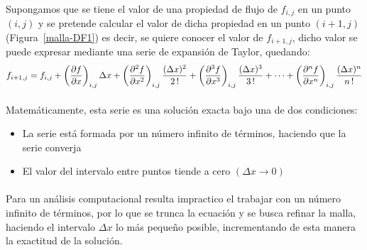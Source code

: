 \documentclass[letterpaper, openright, 12pt]{book}
\begin{document}
    \paragraph*{}
    Supongamos que se tiene el valor de una propiedad de flujo de $f_{i,j}$
    en un punto $(i,j)$ y se pretende calcular el valor de dicha propiedad
    en un punto $(i+1,j)$ (Figura~\ref{malla-DF1}) es decir, se quiere
    conocer el valor de $f_{i+1,j}$, dicho valor se puede expresar mediante
    una serie de expansión de Taylor, quedando:
    \begin{equation}
    f_{i+1,j} = f_{i,j} + \left(\pdv{f}{x} \right)_{i,j} \Delta x
    + \left( \pdv[2]{f}{x} \right)_{i,j} \frac{(\Delta x)^2}{2\,!}
    + \left(\pdv[3]{f}{x} \right)_{i,j} \frac{ (\Delta x)^3 }{3\,!}
    + \dotsb + \left( \pdv[n]{f}{x} \right)_{i,j} \frac{ (\Delta x)^n }{n\,!}
    \label{taylor-forward}
    \end{equation}

    \paragraph*{}
    Matemáticamente, esta serie es una solución exacta bajo una de dos
    condiciones:
    \begin{itemize}
    \item La serie está formada por un número infinito de términos, haciendo
      que la serie converja
    \item El valor del intervalo entre puntos tiende a cero
      $(\Delta x \rightarrow 0)$
    \end{itemize}

    \paragraph*{}
    Para un análisis computacional resulta impractico el trabajar con un número
    infinito de términos, por lo que se trunca la ecuación y se busca refinar la
    malla, haciendo el intervalo $\Delta x$ lo más pequeño posible,
    incrementando de esta manera la exactitud de la solución.
\end{document}
